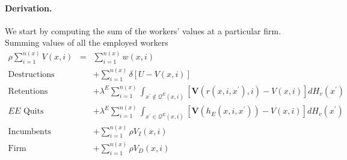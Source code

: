 \paragraph{Derivation.}

We start by computing the sum of the workers' values at a particular firm.
Summing values of all the employed workers
\begin{eqnarray*}
\rho \sum\limits_{i=1}^{n\left( x\right) }V\left( x,i\right)
&=&\sum\limits_{i=1}^{n\left( x\right) }w\left( x,i\right) \\
\text{Destructions} &&+\sum\limits_{i=1}^{n\left( x\right) }\delta \left[
U-V\left( x,i\right) \right] \\
\text{Retentions} &&+\lambda ^{E}\sum\limits_{i=1}^{n\left( x\right)
}\int_{x^{\prime }\notin \mathcal{Q}^{E}\left( x,i\right) }\left[ \boldsymbol{V}%
\left( r\left( x,i,x^{\prime }\right) ,i\right) -V\left( x,i\right) \right]
dH_v\left( x^{\prime }\right) \\
\text{$EE$ Quits} &&+\lambda ^{E}\sum\limits_{i=1}^{n\left( x\right)
}\int_{x^{\prime }\in \mathcal{Q}^{E}\left( x,i\right) }\left[ \boldsymbol{V}%
\left( h_{E}\left( x,i,x^{\prime }\right) \right) -V\left( x,i\right) \right]
dH_v\left( x^{\prime }\right) \\
\text{Incumbents} &&+\sum\limits_{i=1}^{n\left( x\right) }\rho V_{I}(x,i) \\
\text{Firm} &&+\sum\limits_{i=1}^{n\left( x\right) }\rho V_{D}(x,i)
\end{eqnarray*}

